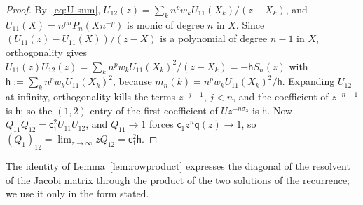 \begin{proof}
By~\eqref{eq:U-sum}, $U_{12}(z)=\sum_kn^pw_kU_{11}(X_k)/(z-X_k)$, and $U_{11}(X)=n^{pn}P_n(Xn^{-p})$ is monic of degree $n$
in $X$. Since $(U_{11}(z)-U_{11}(X))/(z-X)$ is a polynomial of degree $n-1$ in $X$, orthogonality gives
$U_{11}(z)U_{12}(z)=\sum_kn^pw_kU_{11}(X_k)^2/(z-X_k)=-\mathsf hS_n(z)$ with $\mathsf h:=\sum_kn^pw_kU_{11}(X_k)^2$, because
$m_n(k)=n^pw_kU_{11}(X_k)^2/\mathsf h$. Expanding $U_{12}$ at infinity, orthogonality kills the terms $z^{-j-1}$, $j<n$, and
the coefficient of $z^{-n-1}$ is $\mathsf h$; so the $(1,2)$ entry of the first coefficient of $Uz^{-n\sigma_3}$ is $\mathsf h$.
Now $Q_{11}Q_{12}=\mathsf c_1^2U_{11}U_{12}$, and $Q_{11}\to1$ forces $\mathsf c_1z^n\mathsf q(z)\to1$, so
$(Q_1)_{12}=\lim_{z\to\infty}zQ_{12}=\mathsf c_1^2\mathsf h$.
\end{proof}

The identity of Lemma~\ref{lem:rowproduct} expresses the diagonal of the resolvent of the Jacobi matrix through the
product of the two solutions of the recurrence; we use it only in the form stated.

